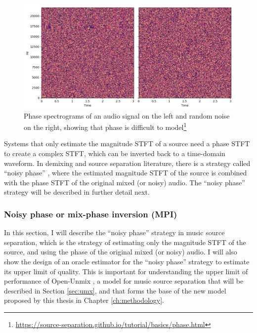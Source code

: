 \documentclass[report.tex]{subfiles}
\begin{document}
\begin{figure}[ht]
       \centering
        \begin{minipage}{1.\textwidth}
               \renewcommand\footnoterule{} %
               \renewcommand{\thempfootnote}{\fnsymbol{mpfootnote}}
               \includegraphics[width=\textwidth]{./images-mss/whynophase.png}
		\caption[Phase spectrograms of an audio signal on the left and random noise on the right, showing that phase is difficult to model]{Phase spectrograms of an audio signal on the left and random noise on the right, showing that phase is difficult to model\footnote[1]{\url{https://source-separation.github.io/tutorial/basics/phase.html}}}
               \label{fig:noisyphase}
       \end{minipage}
\end{figure}

Systems that only estimate the magnitude STFT of a source need a phase STFT to create a complex STFT, which can be inverted back to a time-domain waveform. In demixing and source separation literature, there is a strategy called ``noisy phase'' \parencite{noisyphase1, noisyphase2}, where the estimated magnitude STFT of the source is combined with the phase STFT of the original mixed (or noisy) audio. The ``noisy phase'' strategy will be described in further detail next.

\subsubsection{Noisy phase or mix-phase inversion (MPI)}
\label{sec:noisyphaseoracle}

In this section, I will describe the ``noisy phase'' strategy in music source separation, which is the strategy of estimating only the magnitude STFT of the source, and using the phase of the original mixed (or noisy) audio. I will also show the design of an oracle estimator for the ``noisy phase'' strategy to estimate its upper limit of quality. This is important for understanding the upper limit of performance of Open-Unmix \parencite{umx}, a model for music source separation that will be described in Section \ref{sec:umx}, and that forms the base of the new model proposed by this thesis in Chapter \ref{ch:methodology}.
\end{document}
